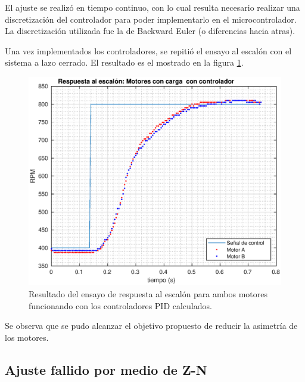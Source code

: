 \documentclass[10pt,conference,a4paper,onecolumn]{article}%
\begin{document}
El ajuste se realizó en tiempo continuo, con lo cual resulta necesario realizar una discretización del controlador para poder implementarlo en el microcontrolador. La discretización utilizada fue la de Backward Euler (o diferencias hacia atras).

Una vez implementados los controladores, se repitió el ensayo al escalón con el sistema a lazo cerrado. El resultado es el mostrado en la figura \ref{fig:respEscLazoCerrado}.
\begin{figure}[h]
\centering
\includegraphics[width=15cm]{./imagenes/resp_escalon_motores_controlados_2}
\caption{Resultado del ensayo de respuesta al escalón para ambos motores funcionando con los controladores PID calculados.}
\label{fig:respEscLazoCerrado}
\end{figure}
Se observa que se pudo alcanzar el objetivo propuesto de reducir la asimetría de los motores.

\subsection{\color{red}Ajuste fallido por medio de Z-N} %
\end{document}
